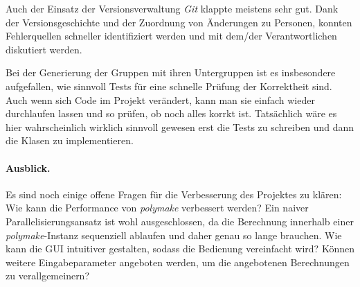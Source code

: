 \noindent Auch der Einsatz der Versionsverwaltung \emph{Git} klappte meistens sehr gut. Dank der Versionsgeschichte und der Zuordnung
von Änderungen zu Personen, konnten Fehlerquellen schneller identifiziert werden und mit dem/der Verantwortlichen diskutiert werden.

\noindent Bei der Generierung der Gruppen mit ihren Untergruppen ist es insbesondere aufgefallen, wie sinnvoll Tests für eine schnelle
Prüfung der Korrektheit sind. Auch wenn sich Code im Projekt verändert, kann man sie einfach wieder durchlaufen lassen und so prüfen,
ob noch alles korrkt ist. Tatsächlich wäre es hier wahrscheinlich wirklich sinnvoll gewesen erst die Tests zu schreiben und dann die
Klasen zu implementieren.

\paragraph{Ausblick.}
Es sind noch einige offene Fragen für die Verbesserung des Projektes zu klären:
Wie kann die Performance von \emph{polymake} verbessert werden? Ein naiver Parallelisierungsansatz ist wohl ausgeschlossen,
da die Berechnung innerhalb einer \emph{polymake}-Instanz sequenziell ablaufen und daher genau so lange brauchen.
Wie kann die GUI intuitiver gestalten, sodass die Bedienung vereinfacht wird?
Können weitere Eingabeparameter angeboten werden, um die angebotenen Berechnungen zu verallgemeinern?

